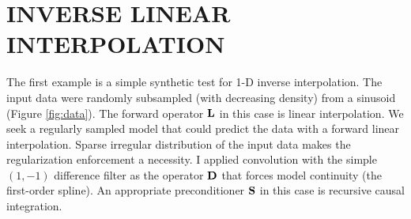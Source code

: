 


\section{INVERSE LINEAR INTERPOLATION}
The first example is a simple synthetic test for 1-D inverse
interpolation. The input data were randomly subsampled (with
decreasing density) from a sinusoid (Figure \ref{fig:data}). The
forward operator $\bold L$ in this case is linear interpolation. We seek
a regularly sampled model that could predict the data with a
forward linear interpolation. Sparse irregular distribution of the
input data makes the regularization enforcement a necessity.
I applied convolution with the simple $(1,-1)$
difference filter as the operator $\bold D$ that forces model continuity
(the first-order spline).
An appropriate preconditioner $\bold S$ in this
case is recursive causal integration. 







